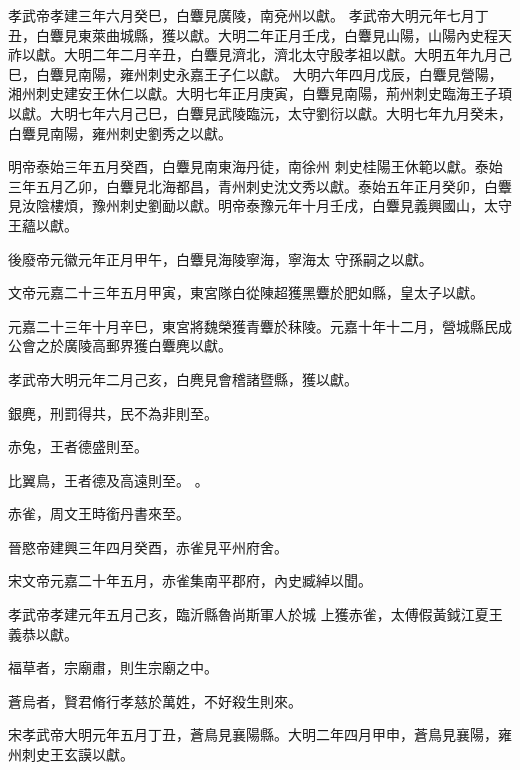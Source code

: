 \begin{pinyinscope}
 孝武帝孝建三年六月癸巳，白麞見廣陵，南兗州以獻。
 孝武帝大明元年七月丁丑，白麞見東萊曲城縣，獲以獻。大明二年正月壬戌，白麞見山陽，山陽內史程天祚以獻。大明二年二月辛丑，白麞見濟北，濟北太守殷孝祖以獻。大明五年九月己巳，白麞見南陽，雍州刺史永嘉王子仁以獻。
 大明六年四月戊辰，白麞見營陽，湘州刺史建安王休仁以獻。大明七年正月庚寅，白麞見南陽，荊州刺史臨海王子頊以獻。大明七年六月己巳，白麞見武陵臨沅，太守劉衍以獻。大明七年九月癸未，白麞見南陽，雍州刺史劉秀之以獻。



 明帝泰始三年五月癸酉，白麞見南東海丹徒，南徐州
 刺史桂陽王休範以獻。泰始三年五月乙卯，白麞見北海都昌，青州刺史沈文秀以獻。泰始五年正月癸卯，白麞見汝陰樓煩，豫州刺史劉勔以獻。明帝泰豫元年十月壬戌，白麞見義興國山，太守王蘊以獻。



 後廢帝元徽元年正月甲午，白麞見海陵寧海，寧海太
 守孫嗣之以獻。



 文帝元嘉二十三年五月甲寅，東宮隊白從陳超獲黑麞於肥如縣，皇太子以獻。



 元嘉二十三年十月辛巳，東宮將魏榮獲青麞於秣陵。元嘉十年十二月，營城縣民成公會之於廣陵高郵界獲白麞麂以獻。



 孝武帝大明元年二月己亥，白麂見會稽諸暨縣，獲以獻。


銀麂，刑罰得共，民不為非則至。


赤兔，王者德盛則至。


比翼鳥，王者德及高遠則至。
 。



 赤雀，周文王時銜丹書來至。



 晉愍帝建興三年四月癸酉，赤雀見平州府舍。



 宋文帝元嘉二十年五月，赤雀集南平郡府，內史臧綽以聞。



 孝武帝孝建元年五月己亥，臨沂縣魯尚斯軍人於城
 上獲赤雀，太傅假黃鉞江夏王義恭以獻。


福草者，宗廟肅，則生宗廟之中。



 蒼烏者，賢君脩行孝慈於萬姓，不好殺生則來。



 宋孝武帝大明元年五月丁丑，蒼鳥見襄陽縣。大明二年四月甲申，蒼鳥見襄陽，雍州刺史王玄謨以獻。




\end{pinyinscope}

